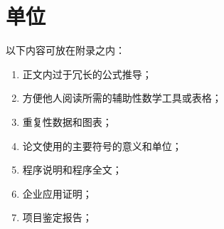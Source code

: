 \appendix

\chapter{单位}

以下内容可放在附录之内：
\begin{enumerate}
\item 正文内过于冗长的公式推导；
\item 方便他人阅读所需的辅助性数学工具或表格；
\item 重复性数据和图表；
\item 论文使用的主要符号的意义和单位；
\item 程序说明和程序全文；
\item 企业应用证明；
\item 项目鉴定报告；
\end{enumerate}